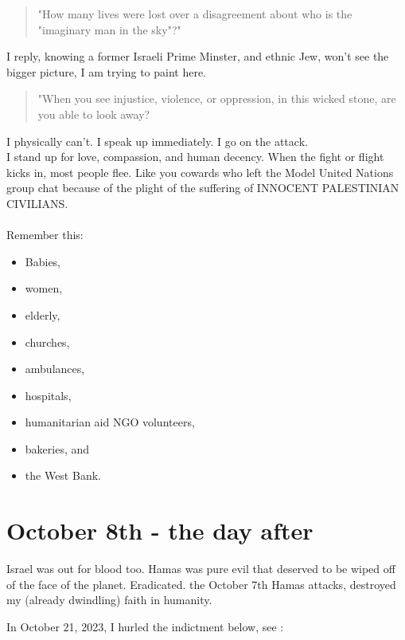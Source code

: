 \documentclass[16pt,openany,oneside]{book}
\begin{document}
\begin{quote}
    "How many lives were lost over a disagreement about who is the "imaginary man in the sky"?"
\end{quote}
I reply, knowing a former Israeli Prime Minster, and ethnic Jew, won't see the bigger picture, I am trying to paint here.
\begin{quote}
    "When you see injustice, violence, or oppression, in this wicked stone, are you able to look away? 
\end{quote}
I physically can't. I speak up immediately. I go on the attack. 
\\ 
I stand up for love, compassion, and human decency. When the fight or flight kicks in, most people flee. Like you cowards who left the Model United Nations group chat because of the plight of the suffering of INNOCENT PALESTINIAN CIVILIANS.
\\\\
Remember this:

\begin{itemize}
    \item Babies,
    \item women, 
    \item elderly, 
    \item churches, 
    \item ambulances, 
    \item hospitals, 
    \item humanitarian aid NGO volunteers, 
    \item bakeries, and 
    \item the West Bank. 
\end{itemize}

\chapter{October 8th - the day after}

Israel was out for blood too. Hamas was pure evil that deserved to be wiped off of the face of the planet. Eradicated. the October 7th Hamas attacks, destroyed my (already dwindling) faith in humanity.

In October 21, 2023, I hurled the indictment below, see \cite{wood2023baddiesisrael}:
\end{document}
